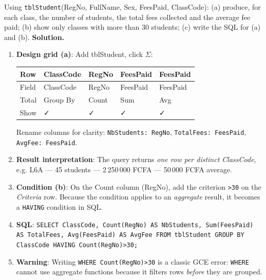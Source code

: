 \documentclass[11pt]{article}
\begin{document}
\begin{exoresolu}
Using \texttt{tblStudent}(RegNo, FullName, Sex, FeesPaid, ClassCode): (a) produce, for each class, the number of students, the total fees collected and the average fee paid; (b) show only classes with more than 30 students; (c) write the SQL for (a) and (b).
\tcblower
\textbf{Solution.}
\begin{enumerate}
\item \textbf{Design grid (a)}: Add tblStudent, click $\Sigma$:
\begin{center}
\begin{tabularx}{\linewidth}{|l|X|X|X|X|}
\hline
\rowcolor{popblueL} \textbf{Row} & \textbf{ClassCode} & \textbf{RegNo} & \textbf{FeesPaid} & \textbf{FeesPaid} \\
\hline
Field & ClassCode & RegNo & FeesPaid & FeesPaid \\
\hline
Total & Group By & Count & Sum & Avg \\
\hline
Show & ✓ & ✓ & ✓ & ✓ \\
\hline
\end{tabularx}
\end{center}
Rename columns for clarity: \texttt{NbStudents: RegNo}, \texttt{TotalFees: FeesPaid}, \texttt{AvgFee: FeesPaid}.
\item \textbf{Result interpretation}: The query returns \emph{one row per distinct ClassCode}, e.g. L6A --- 45 students --- 2\,250\,000 FCFA --- 50\,000 FCFA average.
\item \textbf{Condition (b)}: On the Count column (RegNo), add the criterion \texttt{>30} on the \emph{Criteria} row. Because the condition applies to an \emph{aggregate} result, it becomes a \texttt{HAVING} condition in SQL.
\item \textbf{SQL}:
\texttt{SELECT ClassCode, Count(RegNo) AS NbStudents, Sum(FeesPaid) AS TotalFees, Avg(FeesPaid) AS AvgFee FROM tblStudent GROUP BY ClassCode HAVING Count(RegNo)>30;}
\item \textbf{Warning}: Writing \texttt{WHERE Count(RegNo)>30} is a classic GCE error: \texttt{WHERE} cannot use aggregate functions because it filters rows \emph{before} they are grouped.
\end{enumerate}
\end{exoresolu}
\end{document}
